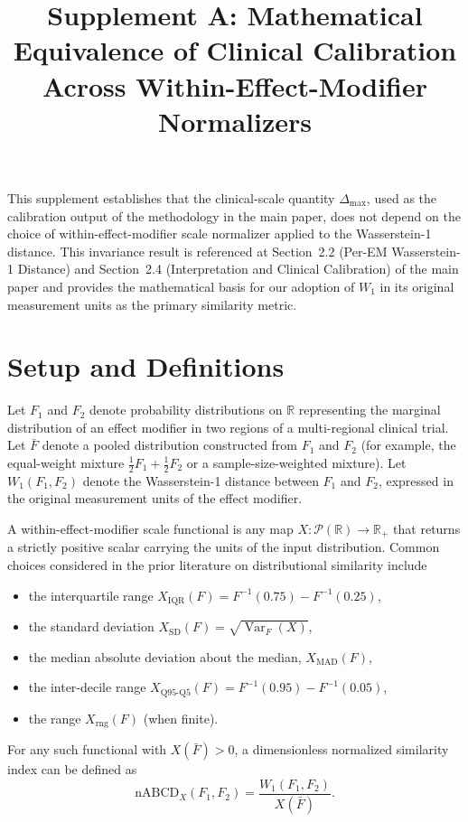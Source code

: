 \documentclass[11pt]{article}
\title{Supplement A: Mathematical Equivalence of Clinical Calibration Across Within-Effect-Modifier Normalizers}
\date{}
\begin{document}
\maketitle

This supplement establishes that the clinical-scale quantity $\Delta_{\max}$, used as the calibration output of the methodology in the main paper, does not depend on the choice of within-effect-modifier scale normalizer applied to the Wasserstein-1 distance. This invariance result is referenced at Section~2.2 (Per-EM Wasserstein-1 Distance) and Section~2.4 (Interpretation and Clinical Calibration) of the main paper and provides the mathematical basis for our adoption of $W_1$ in its original measurement units as the primary similarity metric.

\section{Setup and Definitions}\label{sec:supA_setup}

Let $F_1$ and $F_2$ denote probability distributions on $\mathbb{R}$ representing the marginal distribution of an effect modifier in two regions of a multi-regional clinical trial. Let $\bar{F}$ denote a pooled distribution constructed from $F_1$ and $F_2$ (for example, the equal-weight mixture $\tfrac{1}{2} F_1 + \tfrac{1}{2} F_2$ or a sample-size-weighted mixture). Let $W_1(F_1, F_2)$ denote the Wasserstein-1 distance between $F_1$ and $F_2$, expressed in the original measurement units of the effect modifier.

A within-effect-modifier scale functional is any map $X : \mathcal{P}(\mathbb{R}) \to \mathbb{R}_+$ that returns a strictly positive scalar carrying the units of the input distribution. Common choices considered in the prior literature on distributional similarity include
\begin{itemize}
\item the interquartile range $X_{\text{IQR}}(F) = F^{-1}(0.75) - F^{-1}(0.25)$,
\item the standard deviation $X_{\text{SD}}(F) = \sqrt{\operatorname{Var}_F(X)}$,
\item the median absolute deviation about the median, $X_{\text{MAD}}(F)$,
\item the inter-decile range $X_{\text{Q95-Q5}}(F) = F^{-1}(0.95) - F^{-1}(0.05)$,
\item the range $X_{\text{rng}}(F)$ (when finite).
\end{itemize}
For any such functional with $X(\bar{F}) > 0$, a dimensionless normalized similarity index can be defined as
\begin{equation}
\text{nABCD}_X(F_1, F_2) = \frac{W_1(F_1, F_2)}{X(\bar{F})}.
\label{eq:supA_nabcd}
\end{equation}
\end{document}
